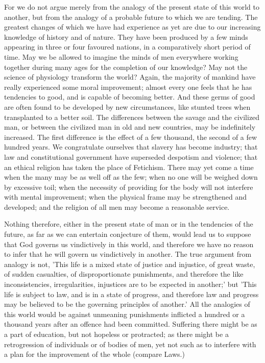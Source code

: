 For we do not argue merely from the analogy of the present state of this
world to another, but from the analogy of a probable future to which we
are tending. The greatest changes of which we have had experience as yet
are due to our increasing knowledge of history and of nature. They have
been produced by a few minds appearing in three or four favoured nations,
in a comparatively short period of time. May we be allowed to imagine the
minds of men everywhere working together during many ages for the
completion of our knowledge? May not the science of physiology transform
the world? Again, the majority of mankind have really experienced some
moral improvement; almost every one feels that he has tendencies to good,
and is capable of becoming better. And these germs of good are often found
to be developed by new circumstances, like stunted trees when transplanted
to a better soil. The differences between the savage and the civilized
man, or between the civilized man in old and new countries, may be
indefinitely increased. The first difference is the effect of a few
thousand, the second of a few hundred years. We congratulate ourselves
that slavery has become industry; that law and constitutional government
have superseded despotism and violence; that an ethical religion has taken
the place of Fetichism. There may yet come a time when the many may be as
well off as the few; when no one will be weighed down by excessive toil;
when the necessity of providing for the body will not interfere with
mental improvement; when the physical frame may be strengthened and
developed; and the religion of all men may become a reasonable service.

Nothing therefore, either in the present state of man or in the tendencies
of the future, as far as we can entertain conjecture of them, would lead
us to suppose that God governs us vindictively in this world, and
therefore we have no reason to infer that he will govern us vindictively
in another. The true argument from analogy is not, 'This life is a mixed
state of justice and injustice, of great waste, of sudden casualties, of
disproportionate punishments, and therefore the like inconsistencies,
irregularities, injustices are to be expected in another;' but 'This life
is subject to law, and is in a state of progress, and therefore law and
progress may be believed to be the governing principles of another.' All
the analogies of this world would be against unmeaning punishments
inflicted a hundred or a thousand years after an offence had been
committed. Suffering there might be as a part of education, but not
hopeless or protracted; as there might be a retrogression of individuals
or of bodies of men, yet not such as to interfere with a plan for the
improvement of the whole (compare Laws.)

